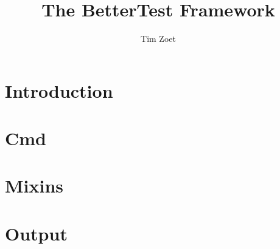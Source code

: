 \documentclass[twoside,a4paper,smallborder=true]{refart}
\title{The BetterTest Framework}
\author{Tim Zoet}
\date{}
\begin{document}
\maketitle

\tableofcontents
\newpage

\section{Introduction}
\label{section:introduction}
\newpage

\section{Cmd}
\label{section:cmd}

\newpage

\section{Mixins}
\label{section:mixins}

\newpage

\section{Output}
\label{section:output}

\newpage

 
 
\printindex
\end{document}
